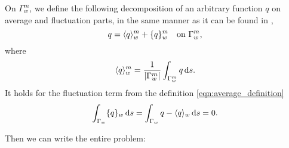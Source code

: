 On $\Gamma^m_w$, we define the following decomposition of an arbitrary function $q$ on average and fluctuation parts, 
in the same manner as it can be found in \cite{koppl_vidotto_2018},
\begin{equation}\label{eqn:average_decomposition}
    q = \langle q\rangle^m_w + \{q\}^m_w \quad \textrm{on } \Gamma^m_w,
\end{equation}
where
\begin{equation} \label{eqn:average_definition}
    \langle q\rangle^m_w = \frac{1}{{\left|\Gamma^m_w\right|}} \int_{\Gamma^m_w} q \,{\rm d} s.
\end{equation}
It holds for the fluctuation term from the definition \eqref{eqn:average_definition}
\begin{equation}
\int_{\Gamma_w} \{q\}_w \,{\rm d} s = \int_{\Gamma_w} q - \langle q\rangle_w \,{\rm d} s = 0.
\end{equation}


Then we can write the entire problem:

